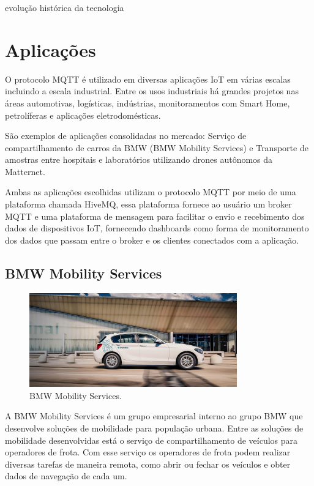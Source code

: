 \documentclass[12pt, a4paper]{article}
\begin{document}
evolução histórica da tecnologia

\cleardoublepage

\section{Aplicações}
    O protocolo MQTT é utilizado em diversas aplicações IoT em várias escalas incluindo a escala industrial. Entre os usos industriais há grandes projetos nas áreas automotivas, logísticas, indústrias, monitoramentos com Smart Home, petrolíferas e aplicações eletrodomésticas.
    \cite{MQTT_Use_Cases}
    
    São exemplos de aplicações consolidadas no mercado: Serviço de compartilhamento de carros da BMW (BMW Mobility Services) e Transporte de amostras entre hospitais e laboratórios utilizando drones autônomos da Matternet.
    \cite{MQTT_Use_Cases}
    
    Ambas as aplicações escolhidas utilizam o protocolo MQTT por meio de uma plataforma chamada HiveMQ, essa plataforma fornece ao usuário um broker MQTT e uma plataforma de mensagem para facilitar o envio e recebimento dos dados de dispositivos IoT, fornecendo dashboards como forma de monitoramento dos dados que passam entre o broker e os clientes conectados com a aplicação.
    \cite{MQTT_Use_Cases, HiveMQ}
    
    \subsection{BMW Mobility Services}\label{BMW Mobility Services}
    
    \begin{figure}[h!]
        \centering
        \includegraphics[width=0.8\textwidth]{images/header-cs-bmw-1600.jpg}
        \caption{BMW Mobility Services.}
        \label{fig:BMW_Mobility_Services}
    \end{figure}
    
        A BMW Mobility Services é um grupo empresarial interno ao grupo BMW que desenvolve soluções de mobilidade para população urbana. Entre as soluções de mobilidade desenvolvidas está o serviço de compartilhamento de veículos para operadores de frota. Com esse serviço os operadores de frota podem realizar diversas tarefas de maneira remota, como abrir ou fechar os veículos e obter dados de navegação de cada um. 
        \cite{HiveMQBMW}
        
\end{document}
